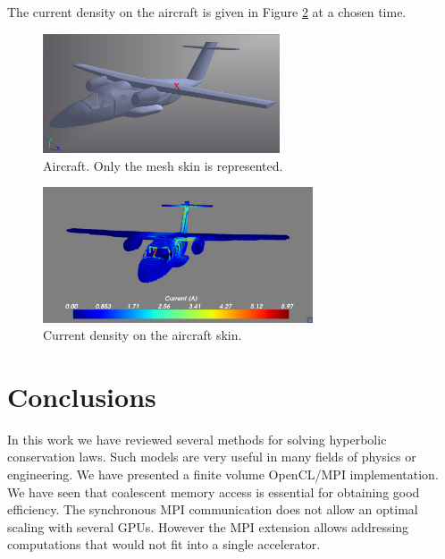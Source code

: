 \documentclass[preprint]{sig-alternate}
\begin{document}
The current density on the aircraft is given in Figure \ref{fig:current} at a chosen time.

\begin{figure}[h]
\begin{center}
\includegraphics[width=7cm]{ntc1-unstructured}
\par\end{center}
\caption{Aircraft. Only the mesh skin is represented.\label{fig:ntc1}}
\end{figure}



\begin{figure}[h]
\begin{center}
\includegraphics[width=8cm]{current}
\par\end{center}
\caption{Current density on the aircraft skin.\label{fig:current}}
\end{figure}





\section{Conclusions}
In this work we have reviewed several methods for solving hyperbolic conservation laws. Such models are very useful in many fields of physics or engineering.
We have presented a finite volume OpenCL/MPI implementation. We have seen that coalescent memory access is essential for obtaining good efficiency. The synchronous MPI communication does not allow an optimal scaling with several GPUs. However the MPI extension allows addressing computations that would not fit into a single accelerator.
\end{document}
